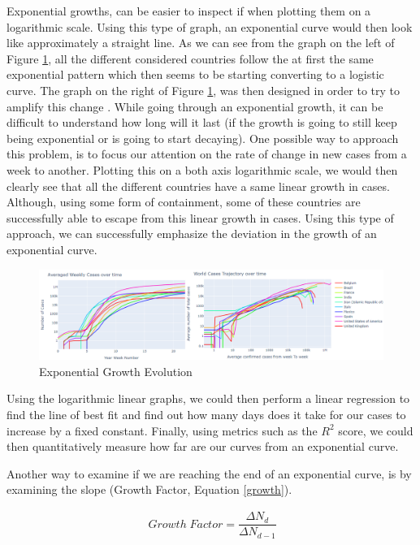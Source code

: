 Exponential growths, can be easier to inspect if when plotting them on a logarithmic scale. Using this type of graph, an exponential curve would then look like approximately a straight line. As we can see from the graph on the left of Figure \ref{exp}, all the different considered countries follow the at first the same exponential pattern which then seems to be starting converting to a logistic curve. The graph on the right of Figure \ref{exp}, was then designed in order to try to amplify this change \cite{physics}. While going through an exponential growth, it can be difficult to understand how long will it last (if the growth is going to still keep being exponential or is going to start decaying). One possible way to approach this problem, is to focus our attention on the rate of change in new cases from a week to another. Plotting this on a both axis logarithmic scale, we would then clearly see that all the different countries have a same linear growth in cases. Although, using some form of containment, some of these countries are successfully able to escape from this linear growth in cases. Using this type of approach, we can successfully emphasize the deviation in the growth of an exponential curve.

\begin{figure}[ht!]%
    \centering
    \includegraphics[width=17cm]{latex/images/logplot.png}%
    \caption{Exponential Growth Evolution}
    \label{exp}
\end{figure}

Using the logarithmic linear graphs, we could then perform a linear regression to find the line of best fit and find out how many days does it take for our cases to increase by a fixed constant. Finally, using metrics such as the $R^{2}$ score, we could then quantitatively measure how far are our curves from an exponential curve.

Another way to examine if we are reaching the end of an exponential curve, is by examining the slope (Growth Factor, Equation \ref{growth}).

\useshortskip
\begin{align}
\ Growth \; Factor = \dfrac{\Delta N_{d}}{\Delta N_{d-1}}
\label{growth}
\end{align}
\useshortskip

